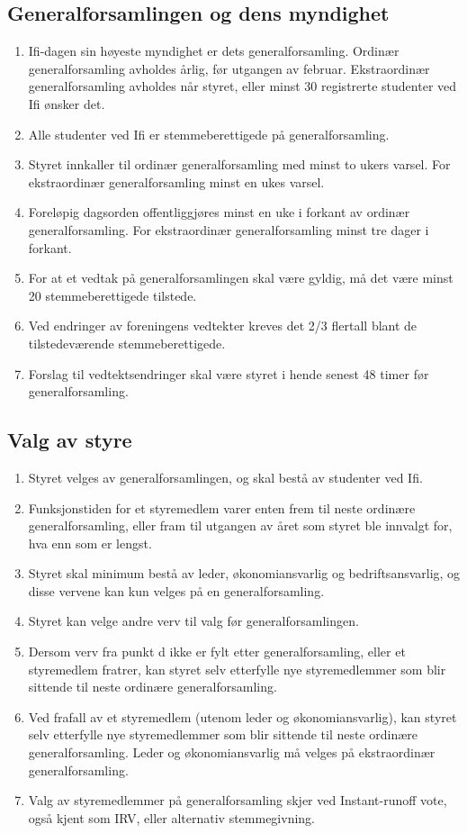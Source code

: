 \documentclass[norsk,a4paper]{article}
\begin{document}
\subsection{Generalforsamlingen og dens myndighet}
\begin{enumerate}
    \item{Ifi-dagen sin høyeste myndighet er dets generalforsamling. Ordinær generalforsamling avholdes årlig, før utgangen av februar. Ekstraordinær generalforsamling avholdes når styret, eller minst 30 registrerte studenter ved Ifi ønsker det.}
    \item{Alle studenter ved Ifi er stemmeberettigede på generalforsamling.}
    \item{Styret innkaller til ordinær generalforsamling med minst to ukers varsel. For ekstraordinær generalforsamling minst en ukes varsel.}
    \item{Foreløpig dagsorden offentliggjøres minst en uke i forkant av ordinær generalforsamling. For ekstraordinær generalforsamling minst tre dager i forkant.}
    \item{For at et vedtak på generalforsamlingen skal være gyldig, må det være minst 20 stemmeberettigede tilstede.}
    \item{Ved endringer av foreningens vedtekter kreves det 2/3 flertall blant de tilstedeværende stemmeberettigede.}
    \item{Forslag til vedtektsendringer skal være styret i hende senest 48 timer før generalforsamling.}
\end{enumerate}
\subsection{Valg av styre}
\begin{enumerate}
    \item{Styret velges av generalforsamlingen, og skal bestå av studenter ved Ifi.}
    \item{Funksjonstiden for et styremedlem varer enten frem til neste ordinære generalforsamling, eller fram til utgangen av året som styret ble innvalgt for, hva enn som er lengst.}
    \item{Styret skal minimum bestå av leder, økonomiansvarlig og bedriftsansvarlig, og disse vervene kan kun velges på en generalforsamling.}
    \item{Styret kan velge andre verv til valg før generalforsamlingen.}
    \item{Dersom verv fra punkt d ikke er fylt etter generalforsamling, eller et styremedlem fratrer, kan styret selv etterfylle nye styremedlemmer som blir sittende til neste ordinære generalforsamling.}
    \item{Ved frafall av et styremedlem (utenom leder og økonomiansvarlig), kan styret selv etterfylle nye styremedlemmer som blir sittende til neste ordinære generalforsamling. Leder og økonomiansvarlig må velges på ekstraordinær generalforsamling.}
    \item{Valg av styremedlemmer på generalforsamling skjer ved Instant-runoff vote, også kjent som IRV, eller alternativ stemmegivning.}
\end{enumerate}
\end{document}
